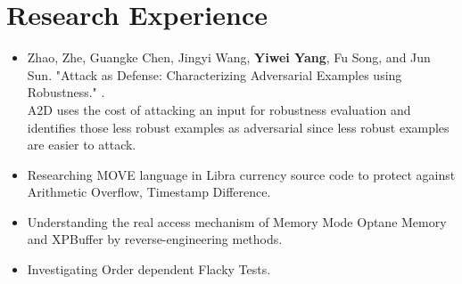 \documentclass{resume}
\newcommand{\en}[1]{#1}
\newcommand{\zh}[1]{}
\begin{document}
\section{\en{Research Experience}\zh{研究经历}}
\en{}
\zh{\datedsubsection{\textbf{\href{http://s3l.shanghaitech.edu.cn/}{上海科技大学系统}\href{https://toast-lab.gitee.io/}{实验室}}}{2019/07 -- 2021/06}}
\en{}
\zh{\role{本科生科研}{实习}}
\begin{itemize}
      \item Zhao, Zhe, Guangke Chen, Jingyi Wang, \textbf{Yiwei Yang}, Fu Song, and Jun Sun. "Attack as Defense: Characterizing Adversarial Examples using Robustness."  .\\
            \small{ \en{A2D uses the cost of attacking an input for robustness evaluation and identifies those less robust examples as adversarial since less robust examples are easier to attack.}
            \zh{A2D使用攻击输入的成本来进行鲁棒性评估，并将那些鲁棒性较差的例子确定为对抗性，因为鲁棒性较差的例子更容易被攻击。}}
      \item \en{Researching MOVE language in Libra currency source code to protect against Arithmetic Overflow, Timestamp Difference.}
            \zh{研究libra源码中的MOVE prover，提高抵御时间戳攻击、整数溢出等的安全性。}
      \item \en{Understanding the real access mechanism of Memory Mode Optane Memory and XPBuffer by reverse-engineering methods.}
            \zh{通过逆向工程的相关手段去理解在memory mode 下傲腾内存以及XPBuffer的访存逻辑。}
\end{itemize}

\en{}
\zh{\datedsubsection{\textbf{\href{https://illinois.edu}{伊利诺伊大学厄巴纳-香槟分校}\href{http://mir.cs.illinois.edu/marinov/}{Darko Marinov组}}}{2021/07 -- 现在}}
\en{}
\zh{\role{本科生科研}{暑研项目}}
\begin{itemize}
      \item \en{Investigating Order dependent Flacky Tests.}
            \zh{使用Flacky Test进行数据竞争检查。}
\end{itemize}
\end{document}
